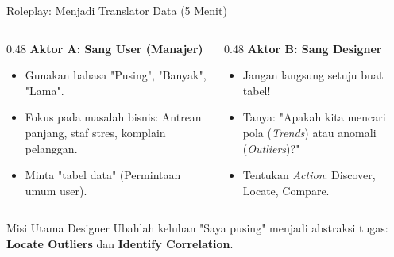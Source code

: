 \documentclass[t]{beamer}
\begin{document}


\begin{frame}{Roleplay: Menjadi Translator Data (5 Menit)}
    \begin{columns}[t]
        \begin{column}{0.48\textwidth}
            \textbf{Aktor A: Sang User (Manajer)}
            \begin{itemize}
                \item Gunakan bahasa "Pusing", "Banyak", "Lama".
                \item Fokus pada masalah bisnis: Antrean panjang, staf stres, komplain pelanggan.
                \item Minta "tabel data" (Permintaan umum user).
            \end{itemize}
        \end{column}
        
        \begin{column}{0.48\textwidth}
            \textbf{Aktor B: Sang Designer}
            \begin{itemize}
                \item Jangan langsung setuju buat tabel!
                \item Tanya: "Apakah kita mencari pola (\textit{Trends}) atau anomali (\textit{Outliers})?"
                \item Tentukan \textit{Action}: Discover, Locate, Compare.
            \end{itemize}
        \end{column}
    \end{columns}
    
    \vspace{0.4cm}
    \begin{alertblock}{Misi Utama Designer}
        Ubahlah keluhan "Saya pusing" menjadi abstraksi tugas: \textbf{Locate Outliers} dan \textbf{Identify Correlation}.
    \end{alertblock}
\end{frame}

\end{document}
